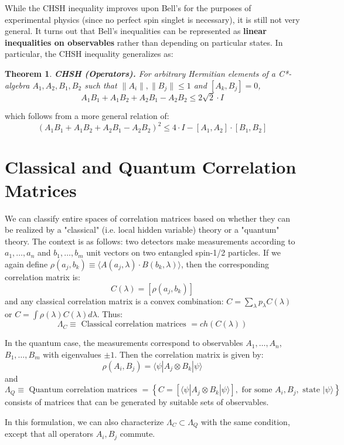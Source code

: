 \documentclass[psamsfonts]{amsart}
\newtheorem{thm}{Theorem}[section]
\theoremstyle{definition}
\theoremstyle{remark}
\numberwithin{equation}{section}
\begin{document}
While the CHSH inequality improves upon Bell's for the purposes of experimental physics (since no perfect spin singlet is necessary), it is still not very general. It turns out that Bell's inequalities can be represented as {\bf linear inequalities on observables} rather than depending on particular states. In particular, the CHSH inequality generalizes as:

\begin{thm}
	{\bf CHSH (Operators).} For arbitrary Hermitian elements of a C*-algebra $A_1,A_2,B_1,B_2$ such that $\|A_i\|,\|B_j\| \leq 1$ and $[A_k,B_j] = 0$,
	$$A_1B_1 + A_1B_2 + A_2B_1 - A_2B_2 \leq 2\sqrt{2}\cdot I$$
\end{thm}

which follows from a more general relation of:
$$(A_1B_1+A_1B_2 + A_2B_1 - A_2B_2)^2 \leq 4\cdot I - [A_1,A_2]\cdot[B_1,B_2]$$

\section{Classical and Quantum Correlation Matrices}

We can classify entire spaces of correlation matrices based on whether they can be realized by a "classical" (i.e. local hidden variable) theory or a "quantum" theory. The context is as follows: two detectors make measurements according to $a_1, \dots, a_n$ and $b_1, \dots, b_m$ unit vectors on two entangled spin-1/2 particles. If we again define $\rho(a_j,b_k) \equiv \langle A(a_j,\lambda)\cdot B(b_k,\lambda)\rangle$, then the corresponding correlation matrix is:
$$C(\lambda) = [\rho(a_j,b_k)]$$
and any classical correlation matrix is a convex combination: $C = \sum_{\lambda} p_{\lambda} C(\lambda)$ or $C = \int \rho(\lambda) C(\lambda) d\lambda$. Thus:
$$\Lambda_C \equiv \text{ Classical correlation matrices } = ch(C(\lambda))$$

In the quantum case, the measurements correspond to observables $A_1, \dots, A_n$, $B_1, \dots, B_m$ with eigenvalues $\pm 1$. Then the correlation matrix is given by:
$$\rho(A_i,B_j) = \langle \psi|A_j\otimes B_k|\psi\rangle$$
and
$$\Lambda_Q \equiv \text{ Quantum correlation matrices } = \left\{ C = [\langle \psi|A_j\otimes B_k|\psi\rangle], \text{ for some } A_i, B_j, \text{ state } |\psi\rangle\right\}$$
consists of matrices that can be generated by suitable sets of observables.

In this formulation, we can also characterize $\Lambda_C \subset \Lambda_Q$ with the same condition, except that all operators $A_i, B_j$ commute.
\end{document}

